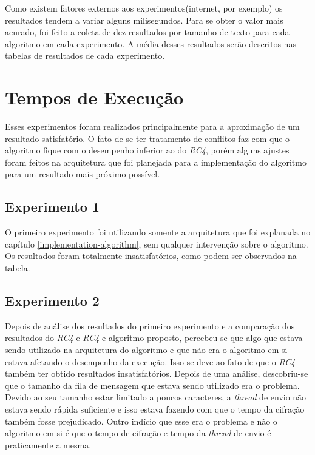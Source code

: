 Como existem fatores externos aos experimentos(internet, por exemplo) os resultados tendem a variar alguns milisegundos. Para se obter o valor mais acurado, foi feito a coleta de dez resultados por tamanho de texto para cada algoritmo em cada experimento. A média desses resultados serão descritos nas tabelas de resultados de cada experimento.

\section{Tempos de Execução}

Esses experimentos foram realizados principalmente para a aproximação de um resultado satisfatório. O fato de se ter tratamento de conflitos faz com que o algoritmo fique com o desempenho inferior ao do \textit{RC4}, porém alguns ajustes foram feitos na arquitetura que foi planejada para a implementação do algoritmo para um resultado mais próximo possível.

\subsection{Experimento 1}

O primeiro experimento foi utilizando somente a arquitetura que foi explanada no capítulo \ref{implementation-algorithm}, sem qualquer intervenção sobre o algoritmo. Os resultados foram totalmente insatisfatórios, como podem ser observados na tabela.

\subsection{Experimento 2}

Depois de análise dos resultados do primeiro experimento e a comparação dos resultados do \textit{RC4} e \textit{RC4} e algoritmo proposto, percebeu-se que algo que estava sendo utilizado na arquitetura do algoritmo e que não era o algoritmo em si estava afetando o desempenho da execução. Isso se deve ao fato de que o \textit{RC4} também ter obtido resultados insatisfatórios. Depois de uma análise, descobriu-se que o tamanho da fila de mensagem que estava sendo utilizado era o problema. Devido ao seu tamanho estar limitado a poucos caracteres, a \textit{thread} de envio não estava sendo rápida suficiente e isso estava fazendo com que o tempo da cifração também fosse prejudicado. Outro indício que esse era o problema e não o algoritmo em si é que o tempo de cifração e tempo da \textit{thread} de envio é praticamente a mesma. 

